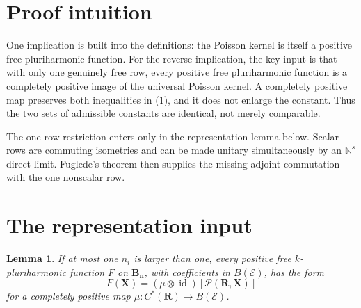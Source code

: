 \documentclass[10pt]{article}
\newtheorem{lemma}[theorem]{Lemma}
\newcommand{\B}{\mathbf B}
\newcommand{\R}{\mathbf R}
\newcommand{\E}{\mathcal E}
\newcommand{\Pcal}{\mathcal P}
\begin{document}
\section{Proof intuition}

One implication is built into the definitions: the Poisson kernel is itself a
positive free pluriharmonic function. For the reverse implication, the key
input is that with only one genuinely free row, every positive free
pluriharmonic function is a completely positive image of the universal
Poisson kernel. A completely positive map preserves both inequalities in
(1), and it does not enlarge the constant. Thus the two sets of admissible
constants are identical, not merely comparable.

The one-row restriction enters only in the representation lemma below. Scalar
rows are commuting isometries and can be made unitary simultaneously by an
$\mathbb N^s$ direct limit. Fuglede's theorem then supplies the missing
adjoint commutation with the one nonscalar row.

\section{The representation input}

\begin{lemma}\label{lem:representation}
If at most one $n_i$ is larger than one, every positive free
$k$-pluriharmonic function $F$ on $\B_{\mathbf n}$, with coefficients in
$B(\E)$, has the form
\[
 F(\mathbf X)
 = (\mu\otimes\operatorname{id})
   [\boldsymbol{\Pcal}(\R,\mathbf X)]
\tag{2}
\]
for a completely positive map $\mu:C^*(\R)\to B(\E)$.
\end{lemma}
\end{document}

